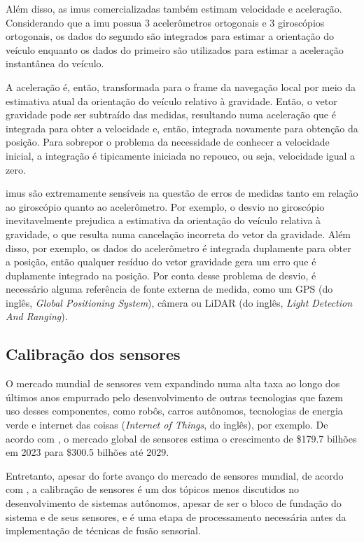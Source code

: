 \documentclass[acronym, symbols, table]{fei}
\begin{document}
				Além disso, as \acrshort{imu}s comercializadas também estimam velocidade e aceleração. Considerando que a \acrshort{imu} possua 3 acelerômetros ortogonais e 3 giroscópios ortogonais, os dados do segundo são integrados para estimar a orientação do veículo enquanto os dados do primeiro são utilizados para estimar a aceleração instantânea do veículo.
				
				A aceleração é, então, transformada para o frame da navegação local por meio da estimativa atual da orientação do veículo relativo à gravidade. Então, o vetor gravidade pode ser subtraído das medidas, resultando numa aceleração que é integrada para obter a velocidade e, então, integrada novamente para obtenção da posição. Para sobrepor o problema da necessidade de conhecer a velocidade inicial, a integração é tipicamente iniciada no repouco, ou seja, velocidade igual a zero.
				
				\acrshort{imu}s são extremamente sensíveis na questão de erros de medidas tanto em relação ao giroscópio quanto ao acelerômetro. Por exemplo, o desvio no giroscópio inevitavelmente prejudica a estimativa da orientação do veículo relativa à gravidade, o que resulta numa cancelação incorreta do vetor da gravidade. Além disso, por exemplo, os dados do acelerômetro é integrada duplamente para obter a posição, então qualquer resíduo do vetor gravidade gera um erro que é duplamente integrado na posição. Por conta desse problema de desvio, é necessário alguma referência de fonte externa de medida, como um GPS (do inglês, \textit{Global Positioning System}), câmera ou LiDAR (do inglês, \textit{Light Detection And Ranging}).
		
		\subsection{Calibração dos sensores}\label{sec:calibracao_sensores}
		
		O mercado mundial de sensores vem expandindo numa alta taxa ao longo dos últimos anos empurrado pelo desenvolvimento de outras tecnologias que fazem uso desses componentes, como robôs, carros autônomos, tecnologias de energia verde e internet das coisas (\textit{Internet of Things}, do inglês), por exemplo. De acordo com \textcite{sensor_market}, o mercado global de sensores estima o crescimento de \$179.7 bilhões em 2023 para \$300.5 bilhões até 2029.
		
		Entretanto, apesar do forte avanço do mercado de sensores mundial, de acordo com \textcite{calibration_av}, a calibração de sensores é um dos tópicos menos discutidos no desenvolvimento de sistemas autônomos, apesar de ser o bloco de fundação do sistema e de seus sensores, e é uma etapa de processamento necessária antes da implementação de técnicas de fusão sensorial.
		
\end{document}
